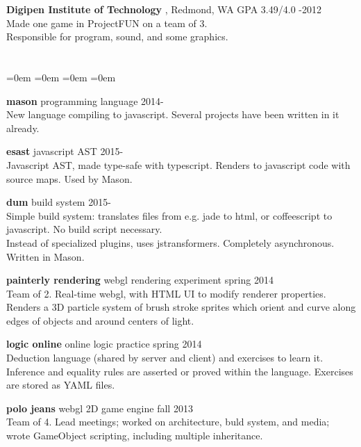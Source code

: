 \documentclass[margin]{res}
\newcommand{\sex}[1]{\section{\fontsize{13}{13}\selectfont{#1}}}
\newcommand{\tit}[1]{{
	\fontsize{11}{12}
	\selectfont
	\textbf{#1}
}}
\newenvironment{noindlist}
	{\begin{list}{}{
		\labelsep=0em \labelwidth=0em \leftmargin=0em \itemindent=0em
		\itemsep=3pt
	}}
	{\end{list}}
\begin{document}
\begin{resume}
	\tit{Digipen Institute of Technology}, Redmond, WA \hfill \textsf{GPA 3.49/4.0 -2012} \\
	Made one game in ProjectFUN on a team of 3. \\
	Responsible for program, sound, and some graphics.

\sex{code}
	\begin{noindlist}
	\item \tit{mason} \enspace \small{programming language} \hfill \textsf{2014-} \\
	New language compiling to javascript. Several projects have been written in it already.
	
	\item \tit{esast} \enspace \small{javascript AST} \hfill \textsf{2015-} \\
	Javascript AST, made type-safe with typescript. Renders to javascript code with source maps. Used by Mason.
	
	\item \tit{dum} \enspace \small{build system} \hfill \textsf{2015-} \\
	Simple build system: translates files from e.g. jade to html, or coffeescript to javascript. No build script necessary. \\
	Instead of specialized plugins, uses jstransformers. Completely asynchronous. Written in Mason.

	\item \tit{painterly rendering} \enspace \small{webgl rendering experiment} \hfill \textsf{spring 2014} \\
	Team of 2. Real-time webgl, with HTML UI to modify renderer properties. \\
	Renders a 3D particle system of brush stroke sprites which orient and curve along edges of objects and around centers of light.

	\item \tit{logic online} \enspace \small{online logic practice} \hfill \textsf{spring 2014} \\
	Deduction language (shared by server and client) and exercises to learn it. Inference and equality rules are asserted or proved within the language. Exercises are stored as YAML files.

	\item \tit{polo jeans} \enspace \small{webgl 2D game engine} \hfill \textsf{fall 2013} \\
	Team of 4. Lead meetings; worked on architecture, buld system, and media; wrote GameObject scripting, including multiple inheritance.
	

\end{noindlist}
\end{resume}
\end{document}
